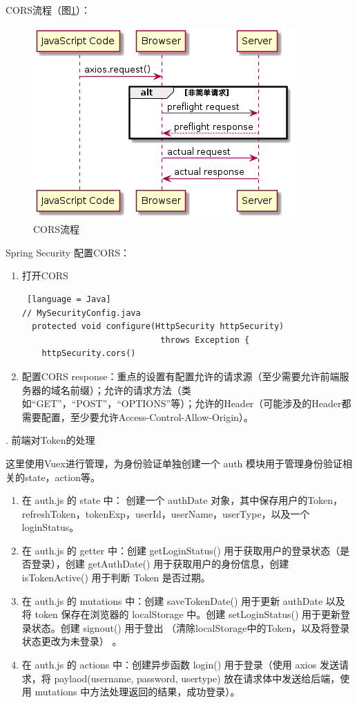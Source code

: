 CORS流程（图\ref{CORS-flow}）：

\begin{figure}[htbp]
  \centering
  \includegraphics[scale = 0.6]{out/uml/时序图/CORS-flow/CORS-flow.png}
  \caption{\song\wuhao CORS流程}
  \label{CORS-flow}
\end{figure}

Spring Security 配置CORS：

\begin{enumerate}
  \item 打开CORS \begin{lstlisting} [language = Java]
// MySecurityConfig.java
  protected void configure(HttpSecurity httpSecurity) 
                            throws Exception {
    httpSecurity.cors()
              \end{lstlisting}
  \item 配置CORS response：重点的设置有配置允许的请求源（至少需要允许前端服务器的域名前缀）；允许的请求方法（类如“GET”，“POST”，“OPTIONS”等）；允许的Header（可能涉及的Header都需要配置，至少要允许Access-Control-Allow-Origin）。
\end{enumerate}

. 前端对Token的处理

这里使用Vuex进行管理，为身份验证单独创建一个 auth 模块用于管理身份验证相关的state，action等。
\begin{enumerate}
  \item 在 auth.js 的 state 中： 创建一个 authDate 对象，其中保存用户的Token，refreshToken，tokenExp，userId，userName，userType，以及一个loginStatus。
  \item 在 auth.js 的 getter 中：创建 getLoginStatus() 用于获取用户的登录状态（是否登录），创建 getAuthDate() 用于获取用户的身份信息，创建 isTokenActive() 用于判断 Token 是否过期。
  \item 在 auth.js 的 mutations 中：创建 saveTokenDate() 用于更新 authDate 以及 将 token 保存在浏览器的 localStorage 中。创建 setLoginStatus() 用于更新登录状态。创建 signout() 用于登出 （清除localStorage中的Token，以及将登录状态更改为未登录） 。
  \item 在 auth.js 的 actions 中：创建异步函数 login() 用于登录（使用 axios 发送请求，将 paylaod(username, password, usertype) 放在请求体中发送给后端，使用 mutations 中方法处理返回的结果，成功登录）。
\end{enumerate}


